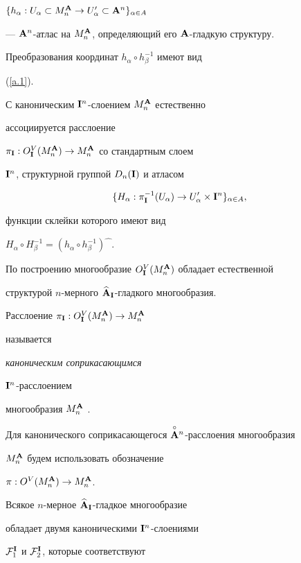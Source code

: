 $\{h_\alpha:U_\alpha\subset M^{\A}_n\to


U'_\alpha\subset\A^n\}_{\alpha \in A}$


--- ${\bold A}^n$-атлас на $M^{\bold A}_n$, определяющий его ${\bold A}$-гладкую структуру.


Преобразования координат $h_\alpha\circ h_\beta^{-1}$ имеют вид


(\ref{a.1}).


С каноническим ${\bold I}^n$-слоением $M^{\bold A}_n$ естественно


ассоциируется расслоение


$\pi_{{\bold I}} : O^V_{{\bold I}}(M^{\bold A}_n)\to M^{\bold A}_n$ со стандартным слоем


${\bold I}^n$, структурной группой $D_n({\bold I})$ и атласом


\begin{equation}


\{H_\alpha :\pi_{\I}^{-1}(U_\alpha)\to U'_\alpha


\times\I^n\}_{\alpha\in A},


\label{k.7}


\end{equation}


функции склейки которого имеют вид


$H_\alpha\circ H_\beta^{-1}={(h_\alpha\circ


h_\beta^{-1})}\widehat{\phantom F}$.


По построению многообразие $O^V_{{\bold I}}(M^{\bold A}_n)$ обладает естественной


структурой $n$-мерного $\widehat{{\bold A}}_{\bold I}$-гладкого многообразия.


Расслоение $\pi_{{\bold I}}:O^V_{{\bold I}}(M^{\bold A}_n)\to M^{\bold A}_n$


называется {\it каноническим соприкасающимся


${\bold I}^n$-расслоением}


многообразия $M_n^{\bold A}$ \cite{VSh3}.


Для канонического соприкасающегося $\overset{\circ}{{\bold A}}{}^n$-расслоения многообразия


$M_n^{\bold A}$ будем использовать обозначение


$\pi:O^V(M^{\bold A}_n)\to M^{\bold A}_n$.


 


Всякое $n$-мерное $\widehat{{\bold A}}_{\bold I}$-гладкое многообразие


обладает двумя каноническими ${\bold I}^n$-слоениями


${\cal F}^{\bold I}_1$ и ${\cal F}^{\bold I}_2$, которые соответствуют


